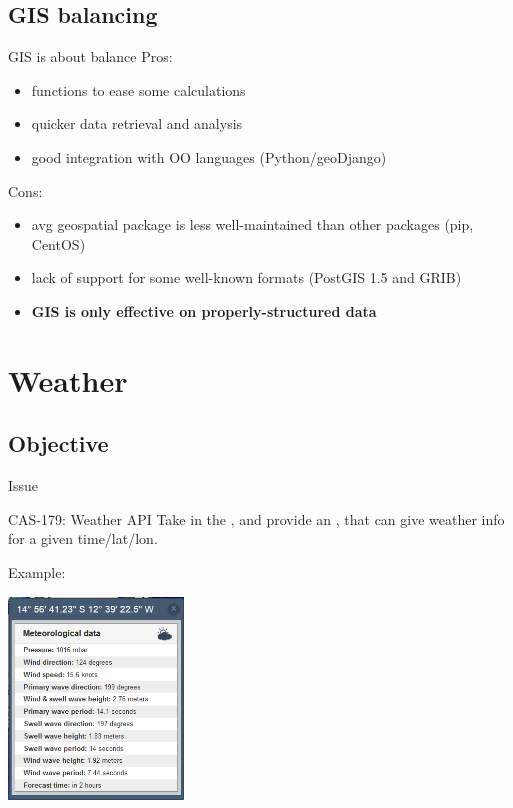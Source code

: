 \documentclass[xcolor=svgnames]{beamer}
\begin{document}
   \subsection{GIS balancing}

        \begin{frame}{GIS is about balance}
            Pros:
            \begin{itemize}
                \item functions to ease some calculations
                \item quicker data retrieval and analysis
                \item good integration with OO languages (Python/geoDjango)
            \end{itemize}
            \pause
            \vspace{0.05\textwidth}
            Cons:
            \begin{itemize}
                \item avg geospatial package is less well-maintained than other packages (pip, CentOS)
                \pause
                \item lack of support for some well-known formats (PostGIS 1.5 and GRIB)
                \pause
                \item \textbf{GIS is only effective on properly-structured data}
            \end{itemize}
        \end{frame}

\section{Weather}

    \subsection{Objective}

        \begin{frame}{Issue}
            \begin{block}{CAS-179: Weather API}
                Take in the , and provide an , that can give weather info for a given time/lat/lon.
            \end{block}
            \vfill
            \pause
            Example:\\
            \begin{center}
                \includegraphics[width=0.35\textwidth]{img/weather_pufi}
            \end{center}
        \end{frame}
\end{document}
